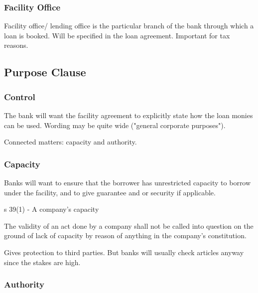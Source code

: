 \documentclass[
]{article}
\newenvironment{env-a3e9d811-f68a-44b4-a14b-e49bc126ec2b}
{
    \savenotes\tcolorbox[blanker,breakable,left=5pt,borderline west={2pt}{-4pt}{green}]
}
{
    \endtcolorbox\spewnotes
}
\begin{document}
\hypertarget{facility-office}{%
\subsubsection{Facility Office}\label{facility-office}}

Facility office/ lending office is the particular branch of the bank
through which a loan is booked. Will be specified in the loan agreement.
Important for tax reasons.

\hypertarget{purpose-clause}{%
\subsection{Purpose Clause}\label{purpose-clause}}

\hypertarget{control}{%
\subsubsection{Control}\label{control}}

The bank will want the facility agreement to explicitly state how the
loan monies can be used. Wording may be quite wide ("general corporate
purposes").

Connected matters: capacity and authority.

\hypertarget{capacity}{%
\subsubsection{Capacity}\label{capacity}}

Banks will want to ensure that the borrower has unrestricted capacity to
borrow under the facility, and to give guarantee and or security if
applicable.

\begin{env-a3e9d811-f68a-44b4-a14b-e49bc126ec2b}

s 39(1) - A company's capacity

The validity of an act done by a company shall not be called into
question on the ground of lack of capacity by reason of anything in the
company's constitution.

\end{env-a3e9d811-f68a-44b4-a14b-e49bc126ec2b}

Gives protection to third parties. But banks will usually check articles
anyway since the stakes are high.

\hypertarget{authority}{%
\subsubsection{Authority}\label{authority}}
\end{document}
